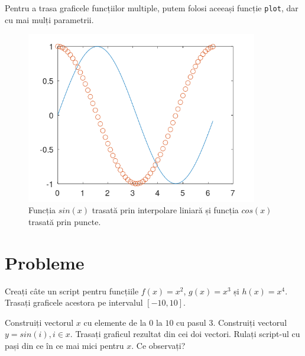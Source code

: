 \documentclass{exam}
\newcommand{\octavescript}[2]{
	
}
\begin{document}
\newpage
\par Pentru a trasa graficele funcțiilor multiple, putem folosi aceeași funcție
\verb|plot|, dar cu mai mulți parametrii.

\octavescript{./src/plot2.m}{}

\begin{figure}[ht]
	\centering
	\includegraphics[width=0.9\textwidth]{plot2}
	\caption{Funcția $sin(x)$ trasată prin interpolare liniară și funcția $cos(x)$ trasată prin puncte.}
\end{figure}

\section{Probleme}

\begin{questions}
	\boxedpoints
	\pointsinmargin

	\question Creați câte un script pentru funcțiile $f(x) = x^2$, $g(x) = x^3$
	și $h(x) = x^4$.
	Trasați graficele acestora pe intervalul $[-10, 10]$.

	\question Construiți vectorul $x$ cu elemente de la $0$ la $10$ cu pasul $3$.
	Construiți vectorul $y = sin(i), i \in x$. Trasați graficul rezultat din cei
	doi vectori. Rulați script-ul cu pași din ce în ce mai mici pentru $x$. Ce
	observați?
\end{questions}
\end{document}
